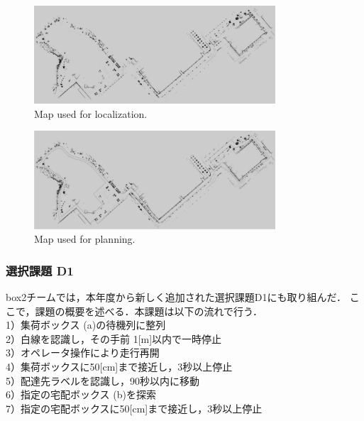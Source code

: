 \documentclass[twocolumn, 9pt]{jsproceedings}
\begin{document}
\begin{figure}[h!]
  \centering
  \includegraphics[width=90mm]{fig/map.pdf}
  \caption{Map used for localization.}
  \label{fig:map}
\end{figure}
\vspace*{-1mm}
\begin{figure}[h!]
  \centering
  \includegraphics[width=90mm]{fig/costmap.pdf}
  \caption{Map used for planning.}
  \label{fig:costmap}
\end{figure}





\subsubsection{選択課題 D1}
box2チームでは，本年度から新しく追加された選択課題D1にも取り組んだ．
ここで，課題の概要を述べる．本課題は以下の流れで行う．\\

1）集荷ボックス (a)の待機列に整列\\
\hspace*{1zw}2）白線を認識し，その手前 1[m]以内で一時停止\\
\hspace*{1zw}3）オペレータ操作により走行再開\\
\hspace*{1zw}4）集荷ボックスに50[cm]まで接近し，3秒以上停止\\
\hspace*{1zw}5）配達先ラベルを認識し，90秒以内に移動\\
\hspace*{1zw}6）指定の宅配ボックス (b)を探索\\
\hspace*{1zw}7）指定の宅配ボックスに50[cm]まで接近し，3秒以上停止\\
\end{document}
